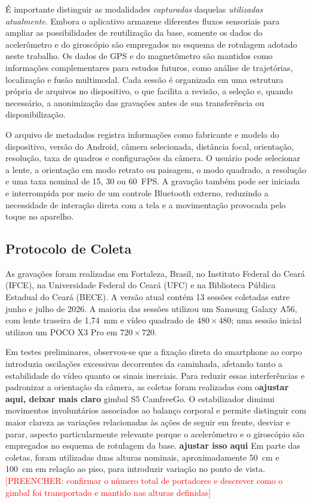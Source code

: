 \documentclass[conference]{IEEEtran}
\newcommand{\todo}[1]{\textcolor{red}{[PREENCHER: #1]}}
\begin{document}
É importante distinguir as modalidades \emph{capturadas} daquelas \emph{utilizadas atualmente}. Embora o aplicativo armazene diferentes fluxos sensoriais para ampliar as possibilidades de reutilização da base, somente os dados do acelerômetro e do giroscópio são empregados no esquema de rotulagem adotado neste trabalho. Os dados de GPS e do magnetômetro são mantidos como informações complementares para estudos futuros, como análise de trajetórias, localização e fusão multimodal. Cada sessão é organizada em uma estrutura própria de arquivos no dispositivo, o que facilita a revisão, a seleção e, quando necessário, a anonimização das gravações antes de sua transferência ou disponibilização.

O arquivo de metadados registra informações como fabricante e modelo do dispositivo, versão do Android, câmera selecionada, distância focal, orientação, resolução, taxa de quadros e configurações da câmera. O usuário pode selecionar a lente, a orientação em modo retrato ou paisagem, o modo quadrado, a resolução e uma taxa nominal de 15, 30 ou 60~FPS. A gravação também pode ser iniciada e interrompida por meio de um controle Bluetooth externo, reduzindo a necessidade de interação direta com a tela e a movimentação provocada pelo toque no aparelho.

\subsection{Protocolo de Coleta}

As gravações foram realizadas em Fortaleza, Brasil, no Instituto Federal do Ceará (IFCE), na Universidade Federal do Ceará (UFC) e na Biblioteca Pública Estadual do Ceará (BECE). A versão atual contém 13 sessões coletadas entre junho e julho de 2026. A maioria das sessões utilizou um Samsung Galaxy A56, com lente traseira de 1,74~mm e vídeo quadrado de $480\times480$; uma sessão inicial utilizou um POCO X3 Pro em $720\times720$.

Em testes preliminares, observou-se que a fixação direta do smartphone ao corpo introduzia oscilações excessivas decorrentes da caminhada, afetando tanto a estabilidade do vídeo quanto os sinais inerciais. Para reduzir essas interferências e padronizar a orientação da câmera, as coletas foram realizadas com o\textbf{ajustar aqui, deixar mais claro} gimbal S5 CamfreeGo. O estabilizador diminui movimentos involuntários associados ao balanço corporal e permite distinguir com maior clareza as variações relacionadas às ações de seguir em frente, desviar e parar, aspecto particularmente relevante porque o acelerômetro e o giroscópio são empregados no esquema de rotulagem da base. \textbf{ajustar isso aqui} Em parte das coletas, foram utilizadas duas alturas nominais, aproximadamente 50~cm e 100~cm em relação ao piso, para introduzir variação no ponto de vista. \todo{confirmar o número total de portadores e descrever como o gimbal foi transportado e mantido nas alturas definidas}
\end{document}
